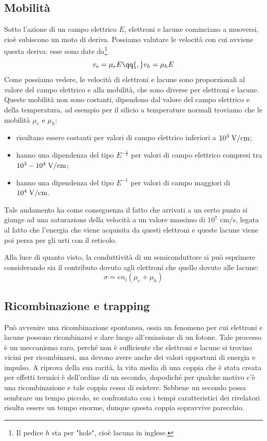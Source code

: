 \subsection{Mobilità}
Sotto l'azione di un campo elettrico $E$, elettroni e lacune cominciano a muoversi, cioè subiscono un moto di deriva. Possiamo valutare le velocità con cui avviene questa deriva: esse sono date da\footnote{Il pedice $h$ sta per "hole", cioè lacuna in inglese.}
\begin{equation*}
   v_e=\mu_e E
   \qq{,}
   v_h=\mu_h E
\end{equation*}
Come possiamo vedere, le velocità di elettroni e lacune sono proporzionali al valore del campo elettrico e alla mobilità, che sono diverse per elettroni e lacune. Queste mobilità non sono costanti, dipendono dal valore del campo elettrico e della temperatura, ad esempio per il silicio a temperature normali troviamo che le mobilità $\mu_e$ e $\mu_h$:
\begin{itemize}[leftmargin=0.5cm]
   \item risultano essere costanti per valori di campo elettrico inferiori a $10^3 \; \rm V/cm$;
   \item hanno una dipendenza del tipo $E^{-\frac{1}{2}}$ per valori di campo elettrico compresi tra $10^3-10^4 \; \rm V/cm$;
   \item hanno una dipendenza del tipo $E^{-1}$ per valori di campo maggiori di $10^4 \; \rm V/cm$.
\end{itemize}
Tale andamento ha come conseguenza il fatto che arrivati a un certo punto si giunge ad una saturazione della velocità a un valore massimo di $10^7$ cm/s, legata al fatto che l'energia che viene acquisita da questi elettroni e queste lacune viene poi persa per gli urti con il reticolo.

Alla luce di quanto visto, la conduttività di un semiconduttore si può esprimere considerando sia il contributo dovuto agli elettroni che quello dovuto alle lacune:
\begin{equation*}
   \sigma=e n_i (\mu_e + \mu_h)
\end{equation*}
\subsection{Ricombinazione e trapping}

Può avvenire una ricombinazione spontanea, ossia un fenomeno per cui elettroni e lacune possono ricombinarsi e dare luogo all'emissione di un fotone. Tale processo è un meccanismo raro, perché non è sufficiente che elettroni e lacune si trovino vicini per ricombinarsi, ma devono avere anche dei valori opportuni di energia e impulso. A riprova della sua rarità, la vita media di una coppia che è stata creata per effetti termici è dell'ordine di un secondo, dopodiché per qualche motivo c'è una ricombinazione e tale coppia cessa di esistere. Sebbene un secondo possa sembrare un tempo piccolo, se confrontato con i tempi caratteristici dei rivelatori risulta essere un tempo enorme, dunque questa coppia sopravvive parecchio.


